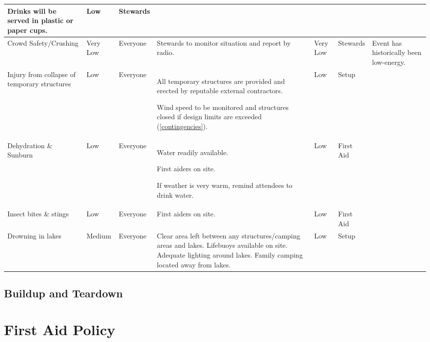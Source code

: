 \begin{landscape}
\begin{table}[h!]
\begin{tabular}{| p{3cm} | l | p{1.5cm} | p{9cm} | p{1.5cm} | p{2cm} | p{6cm} |}
Drinks will be served in plastic or paper cups. &
Low & Stewards & \\ \hline

Crowd Safety/Crushing & Very Low & Everyone &
Stewards to monitor situation and report by radio. &
Very Low & Stewards & Event has historically been low-energy. \\ \hline

Injury from collapse of temporary structures & Low & Everyone &
All temporary structures are provided and erected by reputable external contractors.

Wind speed to be monitored and structures closed if design limits are exceeded (\cref{contingencies}). &
Low & Setup & \\ \hline

Dehydration \& Sunburn & Low & Everyone &
Water readily available.

First aiders on site. 

If weather is very warm, remind attendees to drink water.
& Low & First Aid & \\ \hline

Insect bites \& stings & Low & Everyone &
First aiders on site. & Low & First Aid & \\ \hline

Drowning in lakes & Medium & Everyone &
Clear area left between any structures/camping areas and lakes. 
Lifebuoys available on site. Adequate lighting around lakes.
Family camping located away from lakes.
& Low & Setup & \\ \hline


\end{tabular}
\end{table}
\newpage
\thispagestyle{empty}
\subsection{Buildup and Teardown}


\end{landscape}
\restoregeometry

\appendix

\section{First Aid Policy}
\label{first-aid-policy}

\newpage

